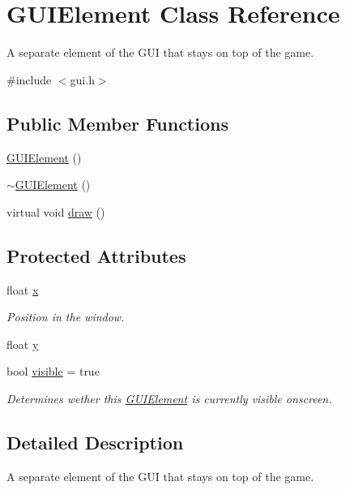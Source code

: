 \hypertarget{class_g_u_i_element}{\section{G\-U\-I\-Element Class Reference}
\label{class_g_u_i_element}
}


A separate element of the G\-U\-I that stays on top of the game.  




{\ttfamily \#include $<$gui.\-h$>$}

\subsection*{Public Member Functions}
\begin{DoxyCompactItemize}
\item 
\hyperlink{class_g_u_i_element_afef4e7a36240156f714dcbadd5d0d825}{G\-U\-I\-Element} ()
\item 
\hyperlink{class_g_u_i_element_a96d6728fa2a9e92a5a0fe6481dfcae15}{$\sim$\-G\-U\-I\-Element} ()
\item 
virtual void \hyperlink{class_g_u_i_element_a2a7207926c6b55dfd0336d86899d8f92}{draw} ()
\end{DoxyCompactItemize}
\subsection*{Protected Attributes}
\begin{DoxyCompactItemize}
\item 
float \hyperlink{class_g_u_i_element_a7d5e8a612605a3ed7cfd11895a91e6ef}{x}
\begin{DoxyCompactList}\small\item\em Position in the window. \end{DoxyCompactList}\item 
float \hyperlink{class_g_u_i_element_a9415b77e6e60981d2be4a39fdd873cf7}{y}
\item 
bool \hyperlink{class_g_u_i_element_a9385814f8643bdb096013a3846c2516b}{visible} = true
\begin{DoxyCompactList}\small\item\em Determines wether this \hyperlink{class_g_u_i_element}{G\-U\-I\-Element} is currently visible onscreen. \end{DoxyCompactList}\end{DoxyCompactItemize}


\subsection{Detailed Description}
A separate element of the G\-U\-I that stays on top of the game. 

